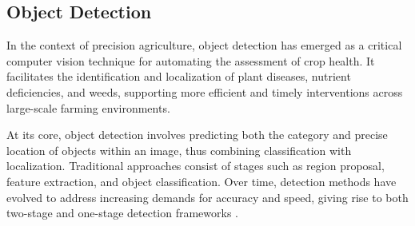 


\subsection{Object Detection}
In the context of precision agriculture, object detection has emerged as a critical computer vision technique for automating the assessment of crop health. It facilitates the identification and localization of plant diseases, nutrient deficiencies, and weeds, supporting more efficient and timely interventions across large-scale farming environments. 

At its core, object detection involves predicting both the category and precise location of objects within an image, thus combining classification with localization. Traditional approaches consist of stages such as region proposal, feature extraction, and object classification. Over time, detection methods have evolved to address increasing demands for accuracy and speed, giving rise to both two-stage and one-stage detection frameworks \parencite{zhao2019objectdetection}.

